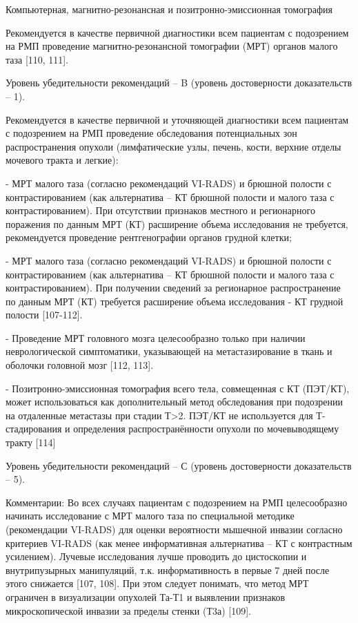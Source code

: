 Компьютерная, магнитно-резонансная и позитронно-эмиссионная томография

Рекомендуется в качестве первичной диагностики всем пациентам с подозрением на РМП проведение магнитно-резонансной томографии (МРТ) органов малого таза [110, 111].

Уровень убедительности рекомендаций – B (уровень достоверности доказательств – 1).

Рекомендуется в качестве первичной и уточняющей диагностики всем пациентам с подозрением на РМП проведение обследования потенциальных зон распространения опухоли (лимфатические узлы, печень, кости, верхние отделы мочевого тракта и легкие):

- МРТ малого таза (согласно рекомендаций VI-RADS) и брюшной полости с контрастированием (как альтернатива – КТ брюшной полости и малого таза с контрастированием). При отсутствии признаков местного и регионарного поражения по данным МРТ (КТ) расширение объема исследования не требуется, рекомендуется проведение рентгенографии органов грудной клетки;

-  МРТ малого таза (согласно рекомендаций VI-RADS) и брюшной полости с контрастированием (как альтернатива – КТ брюшной полости и малого таза с контрастированием). При получении сведений за регионарное распространение по данным МРТ (КТ) требуется расширение объема исследования - КТ грудной полости [107-112].

- Проведение МРТ головного мозга целесообразно только при наличии неврологической симптоматики, указывающей на метастазирование в ткань и оболочки головной мозг [112, 113].

- Позитронно-эмиссионная томография всего тела, совмещенная с КТ (ПЭТ/КТ), может использоваться как дополнительный метод обследования при подозрении на отдаленные метастазы при стадии Т>2. ПЭТ/КТ не используется для Т-стадирования и определения распространённости опухоли по мочевыводящему тракту [114]

Уровень убедительности рекомендаций – С (уровень достоверности доказательств – 5).

Комментарии: Во всех случаях пациентам с подозрением на РМП целесообразно начинать исследование с МРТ малого таза по специальной методике (рекомендации VI-RADS) для оценки вероятности мышечной инвазии согласно критериев VI-RADS (как менее информативная альтернатива – КТ с контрастным усилением). Лучевые исследования лучше проводить до цистоскопии и внутрипузырных манипуляций, т.к. информативность в первые 7 дней после этого снижается [107, 108]. При этом следует понимать, что метод МРТ ограничен в визуализации опухолей Та-Т1 и выявлении признаков микроскопической инвазии за пределы стенки (Т3а) [109].

